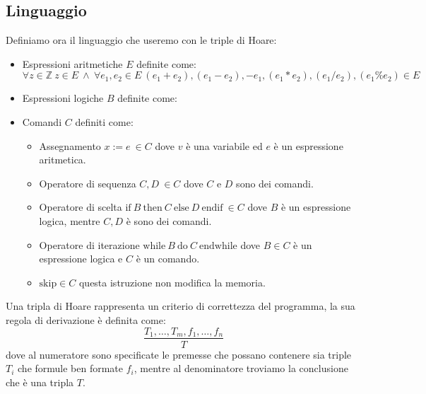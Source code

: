 \subsection{Linguaggio}
Definiamo ora il linguaggio che useremo con le triple di Hoare:
\begin{itemize}
    \item Espressioni aritmetiche $E$ definite come:
          \begin{equation}
              \forall z \in \mathbb{Z} \ z \in E \ \land \ \forall e_1, e_2 \in E \ (e_1 + e_2), (e_1 - e_2), -e_1, (e_1 \ast e_2), (e_1 / e_2), (e_1 \% e_2) \in E
          \end{equation}
    \item Espressioni logiche $B$ definite come:
    \item Comandi $C$ definiti come:
          \begin{itemize}
              \item Assegnamento $x := e \ \in C$ dove $v$ è una variabile ed $e$
                    è un espressione aritmetica.
              \item Operatore di sequenza $C, D \ \in C $ dove $C$ e $D$ sono dei
                    comandi.
              \item Operatore di scelta $\text{if} \ B \ \text{then} \ C \ \text{else} \ D \ \text{endif} \ \in C$
                    dove $B$ è un espressione logica, mentre $C, D$ è sono dei comandi.
              \item Operatore di iterazione $\text{while} \ B \ \text{do} \ C \ \text{endwhile}$
                    dove $B \in C$ è un espressione logica e $C$ è un comando.
              \item $\text{skip} \in C$ questa istruzione non modifica la memoria.
          \end{itemize}
\end{itemize}

Una tripla di Hoare rappresenta un criterio di correttezza del programma, la sua
regola di derivazione è definita come:
\begin{equation}
    \frac{T_1, \dots, T_m, f_1, \dots, f_n}{T}
\end{equation}
dove al numeratore sono specificate le premesse che possano contenere sia triple
$T_i$ che formule ben formate $f_i$, mentre al denominatore troviamo la conclusione
che è una tripla $T$.

